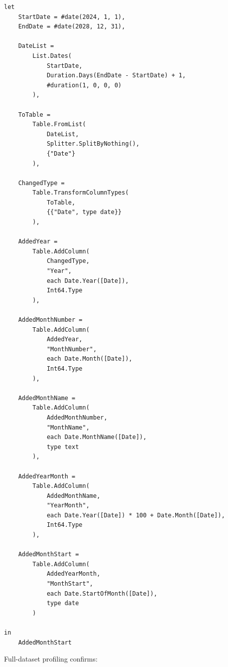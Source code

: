 \documentclass[11pt,a4paper]{article}
\begin{document}
\begin{lstlisting}[style=powerquery]
let
    StartDate = #date(2024, 1, 1),
    EndDate = #date(2028, 12, 31),

    DateList =
        List.Dates(
            StartDate,
            Duration.Days(EndDate - StartDate) + 1,
            #duration(1, 0, 0, 0)
        ),

    ToTable =
        Table.FromList(
            DateList,
            Splitter.SplitByNothing(),
            {"Date"}
        ),

    ChangedType =
        Table.TransformColumnTypes(
            ToTable,
            {{"Date", type date}}
        ),

    AddedYear =
        Table.AddColumn(
            ChangedType,
            "Year",
            each Date.Year([Date]),
            Int64.Type
        ),

    AddedMonthNumber =
        Table.AddColumn(
            AddedYear,
            "MonthNumber",
            each Date.Month([Date]),
            Int64.Type
        ),

    AddedMonthName =
        Table.AddColumn(
            AddedMonthNumber,
            "MonthName",
            each Date.MonthName([Date]),
            type text
        ),

    AddedYearMonth =
        Table.AddColumn(
            AddedMonthName,
            "YearMonth",
            each Date.Year([Date]) * 100 + Date.Month([Date]),
            Int64.Type
        ),

    AddedMonthStart =
        Table.AddColumn(
            AddedYearMonth,
            "MonthStart",
            each Date.StartOfMonth([Date]),
            type date
        )

in
    AddedMonthStart
\end{lstlisting}

Full-dataset profiling confirms:
\end{document}
